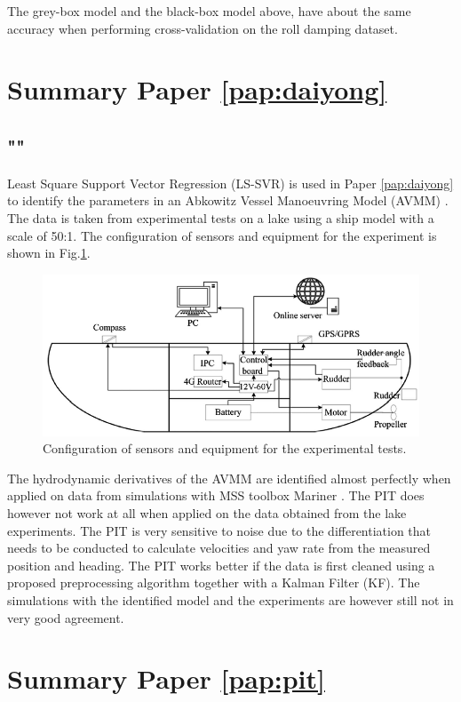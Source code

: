 \noindent The grey-box model and the black-box model above, have about the same accuracy when performing cross-validation on the roll damping dataset.

\section{Summary Paper \ref{pap:daiyong}}
\subsection*{""}
Least Square Support Vector Regression (LS-SVR) \cite{brereton_support_2010} is used in Paper \ref{pap:daiyong} to identify the parameters in an Abkowitz Vessel Manoeuvring Model (AVMM) \cite{abkowitz_ship_1964}.  
The data is taken from experimental tests on a lake using a ship model with a scale of 50:1. The configuration of sensors and equipment for the experiment is shown in Fig.\ref{fig:cthmodel}.  
\begin{figure}[H]
    \centering
    \includegraphics[width=\textwidth]{kappa/images/cth_model.png}
    \caption{Configuration of sensors and equipment for the experimental tests.}
    \label{fig:cthmodel}
\end{figure}
\noindent The hydrodynamic derivatives of the AVMM are identified almost perfectly when applied on data from simulations with MSS toolbox Mariner \cite{tristan_matlab_2009}. The PIT does however not work at all when applied on the data obtained from the lake experiments. The PIT is very sensitive to noise due to the differentiation that needs to be conducted to calculate velocities and yaw rate from the measured position and heading. The PIT works better if the data is first cleaned using a proposed preprocessing algorithm together with a Kalman Filter (KF). The simulations with the identified model and the experiments are however still not in very good agreement.     

\section{Summary Paper \ref{pap:pit}}
